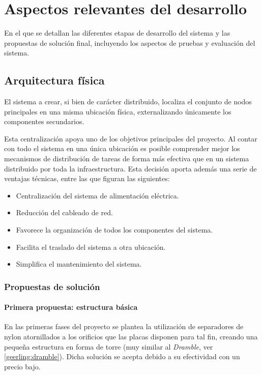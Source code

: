 \chapter{Aspectos relevantes del desarrollo}

\begin{cabstract}
En el que se detallan las diferentes etapas de desarrollo del sistema y las propuestas de solución final, incluyendo los aspectos de pruebas y evaluación del sistema. 
\end{cabstract}

\section{Arquitectura física}

El sistema a crear, si bien de carácter distribuido, localiza el conjunto de nodos principales en una misma ubicación física, externalizando únicamente los componentes secundarios.

Esta centralización apoya uno de los objetivos principales del proyecto. Al contar con todo el sistema en una única ubicación es posible comprender mejor los mecanismos de distribución de tareas de forma más efectiva que en un sistema distribuido por toda la infraestructura. Esta decisión aporta además una serie de ventajas técnicas, entre las que figuran las siguientes:

\begin{itemize}
\item Centralización del sistema de alimentación eléctrica.
\item Reducción del cableado de red.
\item Favorece la organización de todos los componentes del sistema.
\item Facilita el traslado del sistema a otra ubicación.
\item Simplifica el mantenimiento del sistema.
\end{itemize}

\subsection{Propuestas de solución}

\subsubsection{Primera propuesta: estructura básica}

En las primeras fases del proyecto se plantea la utilización de separadores de nylon atornillados a los orificios que las placas disponen para tal fin, creando una pequeña estructura en forma de torre (muy similar al \textit{Dramble}, ver \ref{geerling:dramble}). Dicha solución se acepta debido a su efectividad con un precio bajo.


